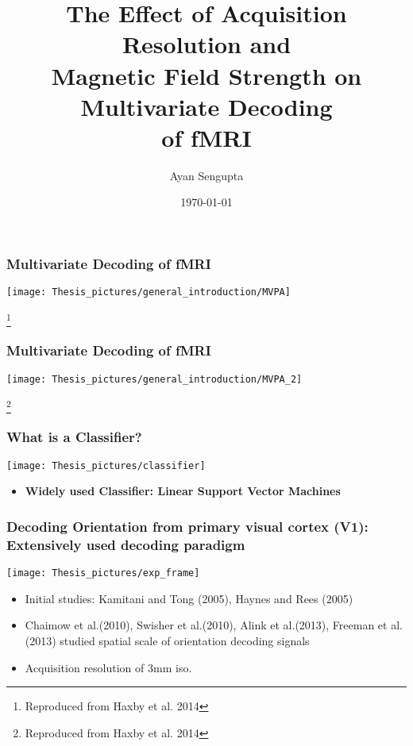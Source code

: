 \documentclass{beamer}
\title{The Effect of Acquisition Resolution and \\ Magnetic Field Strength on \\ Multivariate Decoding \\ of fMRI}
\author{Ayan Sengupta}
\institute[Affiliations] %
{
  Institute of Psychology\\
  Faculty of Natural Sciences\\
  Otto-von-Guericke University\\
  Magdeburg
}
\date{\today}
\newcommand\blfootnote[1]{%
  \begingroup
  \renewcommand\thefootnote{}\footnote{#1}%
  \addtocounter{footnote}{-1}%
  \endgroup
}
\begin{document}
\frame{\titlepage}


    

	\begin{frame}
		\frametitle{Multivariate Decoding of fMRI}
		\begin{center}
			\texttt{[image: Thesis\_pictures/general\_introduction/MVPA]}
		\end{center}
		\blfootnote{Reproduced from Haxby et al. 2014}
	\end{frame}
    

	\begin{frame}
		\frametitle{Multivariate Decoding of fMRI}
		\begin{center}
			\texttt{[image: Thesis\_pictures/general\_introduction/MVPA\_2]}
		\end{center}
		\blfootnote{Reproduced from Haxby et al. 2014}
	\end{frame}


	\begin{frame}
		\frametitle{What is a Classifier?}
		\begin{center}
			\texttt{[image: Thesis\_pictures/classifier]}
		\end{center}
		\begin{itemize}
			\item \textbf{Widely used Classifier: Linear Support Vector Machines}
		\end{itemize}
	\end{frame}


    
	\begin{frame}
		\frametitle{Decoding Orientation from primary visual cortex (V1): Extensively used decoding paradigm}
		\begin{center}
			\texttt{[image: Thesis\_pictures/exp\_frame]}
		\end{center}
		\begin{itemize}
			\item Initial studies: Kamitani and Tong (2005), Haynes and Rees (2005)
			\item Chaimow et al.(2010), Swisher et al.(2010), Alink et al.(2013), 
			Freeman et al.(2013) studied spatial scale of orientation decoding signals
			\item Acquisition resolution of 3mm iso.
		\end{itemize}
	\end{frame}
  
\end{document}

